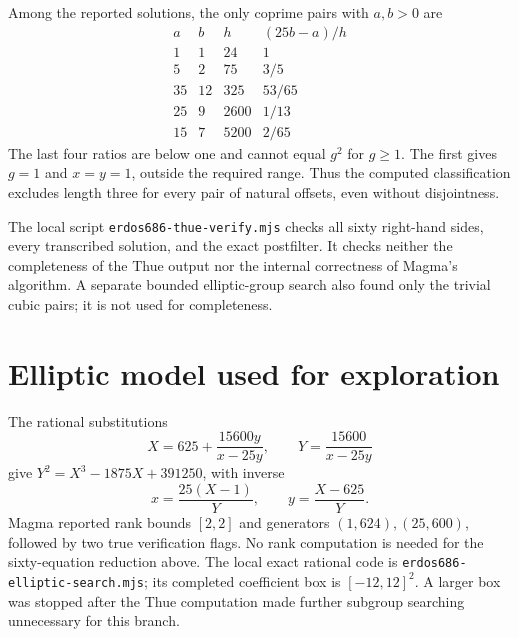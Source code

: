 \documentclass[11pt]{article}
\begin{document}
Among the reported solutions, the only coprime pairs with $a,b>0$ are
\[
\begin{array}{c|c|c|c}
 a&b&h&(25b-a)/h\\\hline
 1&1&24&1\\
 5&2&75&3/5\\
 35&12&325&53/65\\
 25&9&2600&1/13\\
 15&7&5200&2/65
\end{array}
\]
The last four ratios are below one and cannot equal $g^2$ for $g\ge1$.
The first gives $g=1$ and $x=y=1$, outside the required range.
Thus the computed classification excludes length three for every pair of
natural offsets, even without disjointness.

The local script \texttt{erdos686-thue-verify.mjs} checks all sixty right-hand
sides, every transcribed solution, and the exact postfilter. It checks
neither the completeness of the Thue output nor the internal correctness
of Magma's algorithm. A separate bounded elliptic-group search also found
only the trivial cubic pairs; it is not used for completeness.

\section*{Elliptic model used for exploration}
The rational substitutions
\[
 X=625+\frac{15600y}{x-25y},\qquad Y=\frac{15600}{x-25y}
\]
give $Y^2=X^3-1875X+391250$, with inverse
\[
 x=\frac{25(X-1)}Y,\qquad y=\frac{X-625}Y.
\]
Magma reported rank bounds $[2,2]$ and generators $(1,624),(25,600)$,
followed by two true verification flags. No rank computation is needed
for the sixty-equation reduction above. The local exact rational code is
\texttt{erdos686-elliptic-search.mjs}; its completed coefficient box is
$[-12,12]^2$. A larger box was stopped after the Thue computation made
further subgroup searching unnecessary for this branch.
\end{document}
